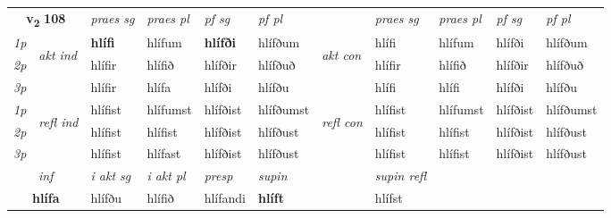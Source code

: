 \noindent
\begin{tabular}{lllllllllll} \toprule
\multicolumn{2}{c}{\textbf{v{\textsubscript{2}}} \Large{\textbf{108}}}  &  \textit{praes sg}  & \textit{praes pl}  &\textit{ pf sg} & \textit{pf pl} &  &  \textit{praes sg}  & \textit{praes pl}  & \textit{pf sg} & \textit{pf pl } \\*
	\cmidrule{3-6} \cmidrule{8-11}
 {\textit{1p}} & \multirow{3}{*}{\begin{turn}{90}\textit{akt ind}\end{turn}} & \textbf{hlífi} & hlífum & \textbf{hlífði} & hlífðum & \multirow{3}{*}{\begin{turn}{90}\textit{akt con}\end{turn}} &hlífi & hlífum & hlífði & hlífðum\\*
 {\textit{2p}} &  &  hlífir  & hlífið & hlífðir & hlífðuð & & hlífir & hlífið & hlífðir & hlífðuð \\*
{\textit{3p}} &  & hlífir & hlífa & hlífði & hlífðu & & hlífi & hlífi& hlífði & hlífðu \\*
\cmidrule{3-6} \cmidrule{8-11}
 {\textit{1p}} & \multirow{3}{*}{\begin{turn}{90}\textit{refl ind}\end{turn}}  & hlífist & hlífumst & hlífðist & hlífðumst & \multirow{3}{*}{\begin{turn}{90}\textit{refl con}\end{turn}}  &hlífist & hlífumst & hlífðist & hlífðumst \\*
 {\textit{2p}} &  & hlífist & hlífist & hlífðist & hlífðust & &hlífist & hlífist & hlífðist & hlífðust \\*
 {\textit{3p}}  & & hlífist & hlífast & hlífðist & hlífðust & & hlífist & hlífist& hlífðist & hlífðust \\*
\cmidrule{3-6} \cmidrule{8-11}

   \multicolumn{2}{c}{\textit{inf}}  & \textit{i akt sg} & \textit{i akt pl}   & \textit{presp} & \textit{supin} && \textit{supin refl}  \\*
  \multicolumn{2}{c}{\textbf{hlífa}} & hlífðu  & hlífið   & hlífandi &  \textbf{hlíft} && hlífst  \\*
\end{tabular}

